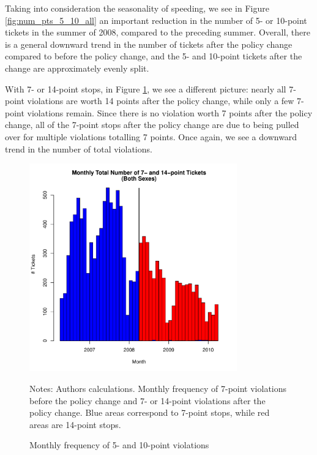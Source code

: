 Taking into consideration the seasonality of speeding, we see 
in Figure \ref{fig:num_pts_5_10_all}
an important reduction in the number of 5- or 10-point tickets 
in the summer of 2008, compared to the preceding summer. 
Overall, there is a general downward trend in the number of tickets 
after the policy change compared to before the policy change, 
and the 5- and 10-point tickets after the change are approximately evenly split. 

With 7- or 14-point stops,
in Figure \ref{fig:num_pts_7_14_all}, 
we see a different picture: 
nearly all 7-point violations are worth 14 points after the policy change, 
while only a few 7-point violations remain. 
Since there is no violation worth 7 points after the policy change, 
all of the 7-point stops after the policy change are due to being pulled over 
for multiple violations totalling 7 points. 
Once again, we see a downward trend in the number of total violations. %



\begin{figure}
\centering
\includegraphics[width=0.8\textwidth]{Figures/num_pts_7_14_all_orig.pdf}
\caption{Monthly frequency of 5- and 10-point violations }
Notes: Authors calculations. 
Monthly frequency of 7-point violations before the policy change 
and 7- or 14-point violations after the policy change. 
Blue areas correspond to 7-point stops, while red areas are 14-point stops.
\label{fig:num_pts_7_14_all}
\end{figure}



